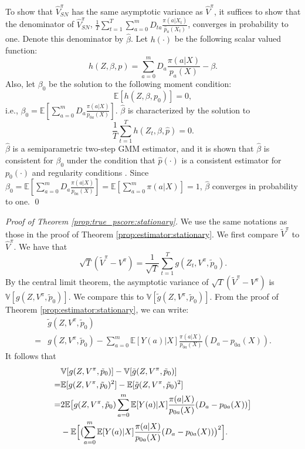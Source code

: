 \documentclass[letterpaper]{article} \usepackage{aaai19}  \usepackage{times}  \usepackage{helvet}  \usepackage{courier}  \usepackage{url}  \usepackage{graphicx}  \frenchspacing  \usepackage{comment}
\begin{document}
To show that $\hat V^\pi_{SN}$ has the same asymptotic variance as $\hat V^\pi$, it suffices to show that the denominator of $\hat V^\pi_{SN}$, $\frac{1}{T}\sum_{t=1}^T\sum_{a=0}^mD_{ta}\frac{\pi(a|X_t)}{\hat p_a(X_t)}$, converges in probability to one.
Denote this denominator by $\hat\beta$.
Let $h(\cdot)$ be the following scalar valued function:
$$
h(Z,\beta,p)=\sum_{a=0}^mD_{a}\frac{\pi(a|X)}{p_a(X)}-\beta.
$$
Also, let $\beta_0$ be the solution to the following moment condition:
$$
\mathbb{E}[h(Z,\beta,p_0)]=0,
$$
i.e., $\beta_0=\mathbb{E}[\sum_{a=0}^mD_{a}\frac{\pi(a|X)}{p_{0a}(X)}]$.
$\hat\beta$ is characterized by the solution to
$$
\frac{1}{T}\sum_{t=1}^Th(Z_t,\beta,\hat p)=0.
$$
$\hat \beta$ is a semiparametric two-step GMM estimator, and it is shown that $\hat \beta$ is consistent for $\beta_0$ under the condition that $\hat p(\cdot)$ is a consistent estimator for $p_0(\cdot)$ and regularity conditions \cite{Newey1994}.
Since $\beta_0=\mathbb{E}[\sum_{a=0}^mD_{a}\frac{\pi(a|X)}{p_{0a}(X)}]=\mathbb{E}[\sum_{a=0}^m\pi(a|X)]=1$, $\hat \beta$ converges in probability to one.
\qed
\par
\noindent
\noindent \textit{Proof of Theorem \ref{prop:true_pscore:stationary}.}
We use the same notations as those in the proof of Theorem \ref{prop:estimator:stationary}.
We first compare $\tilde V^\pi$ to $\hat V^\pi$.
We have that
$$
\sqrt{T}(\tilde V^{\pi}-V^{\pi})=\frac{1}{\sqrt{T}}\sum_{t=1}^T g(Z_t,V^{\pi},\tilde p_0).
$$
By the central limit theorem, the asymptotic variance of $\sqrt{T}(\tilde V^{\pi}-V^{\pi})$ is $\mathbb{V}[g(Z,V^{\pi},\tilde p_0)]$.
We compare this to $\mathbb{V}[\tilde g(Z,V^{\pi},\tilde p_0)]$.
From the proof of Theorem \ref{prop:estimator:stationary}, we can write:
\begin{align*}
	&\tilde g(Z,V^{\pi},\tilde p_0)\\
	=&g(Z,V^{\pi},\tilde p_0)-\sum_{a=0}^m\mathbb{E}[Y(a)|X]\frac{\pi(a|X)}{p_{0a}(X)}(D_a-p_{0a}(X)).
\end{align*}
It follows that
\begin{align*}
	&\mathbb{V}[g(Z,V^{\pi},\tilde p_0)]-\mathbb{V}[\tilde g(Z,V^{\pi},\tilde p_0)]\\
	=&\mathbb{E}[g(Z,V^{\pi},\tilde p_0)^2]-\mathbb{E}[\tilde g(Z,V^{\pi},\tilde p_0)^2]\\
	=&2\mathbb{E}\bigl[g(Z,V^{\pi},\tilde p_0)\sum_{a=0}^m\mathbb{E}[Y(a)|X]\frac{\pi(a|X)}{p_{0a}(X)}(D_a-p_{0a}(X))\bigr]\\
	&-\mathbb{E}\Bigl[\bigl(\sum_{a=0}^m\mathbb{E}[Y(a)|X]\frac{\pi(a|X)}{p_{0a}(X)}(D_a-p_{0a}(X))\bigr)^2\Bigr].
\end{align*}
\end{document}

